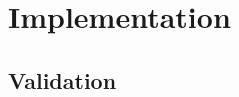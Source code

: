 \documentclass{article}
\begin{document}
\section{Implementation}

\subsection{Validation}

\nocite{*}


\end{document}

